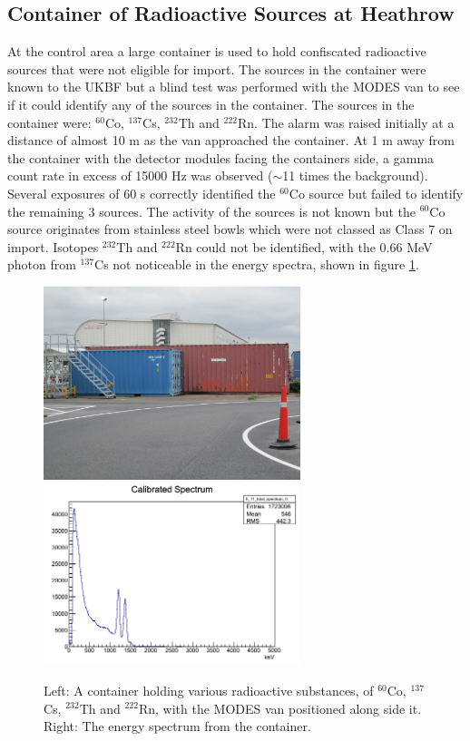 \subsection{Container of Radioactive Sources at Heathrow}
At the control area a large container is used to hold confiscated radioactive sources that were not eligible for import. The sources in the container were known to the UKBF but a blind test was performed with the MODES van to see if it could identify any of the sources in the container. The sources in the container were: $^{60}$Co, $^{137}$Cs, $^{232}$Th and $^{222}$Rn. The alarm was raised initially at a distance of almost 10 m as the van approached the container. At 1 m away from the container with the detector modules facing the containers side, a gamma count rate in excess of 15000 Hz was observed ($\sim$11 times the background). Several exposures of 60 s correctly identified the $^{60}$Co source but failed to identify the remaining 3 sources. The activity of the sources is not known but the $^{60}$Co source originates from stainless steel bowls which were not classed as Class 7 on import. Isotopes $^{232}$Th and $^{222}$Rn could not be identified, with the 0.66 MeV photon from $^{137}$Cs not noticeable in the energy spectra, shown in figure \ref{fig:cobalt60Container}.

\begin{figure}
\begin{center}
\includegraphics[width=75mm]{./Chapter7/figures/container.jpg}
\includegraphics[width=75mm]{./Chapter7/figures/co60Gamma01Container060514-1120.png}
\end{center}
\caption{Left: A container holding various radioactive substances, of $^{60}$Co, $^{137}$Cs, $^{232}$Th and $^{222}$Rn, with the MODES van positioned along side it. Right: The energy spectrum from the container.}
\label{fig:cobalt60Container}
\end{figure}

